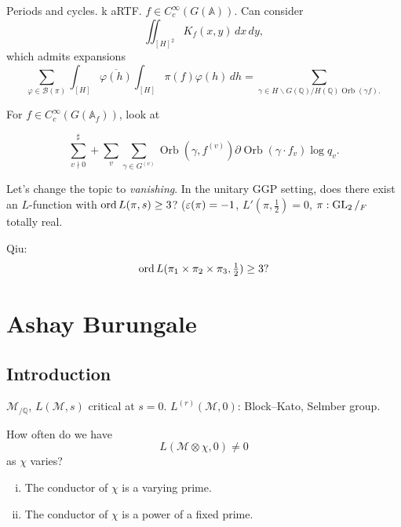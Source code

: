 \documentclass[reqno]{amsart} 
\begin{document}
Periods and cycles.
k
aRTF.  $f \in C_c^\infty(G(\mathbb{A}))$.  Can consider
\begin{equation*}
  \iint_{[H]^2 }
  K_f(x, y) \, d x \, d y,
\end{equation*}
which admits expansions
\begin{equation*}
  \sum_{\varphi \in \mathcal{B}(\pi)} \int_{[H]} \overline{\varphi (h)} \int_{[H]} \pi(f) \varphi(h) \, d h
  = \sum_{\gamma \in H \backslash G(\mathbb{Q}) / H(\mathbb{Q}) \operatorname{Orb}(\gamma f).}
\end{equation*}

For $f \in C_c^\infty(G(\mathbb{A}_f))$, look at

\begin{equation*}
  \sum_{v \nmid 0}^{\sharp} + \sum_v \sum_{\gamma \in G^{(v) }} \operatorname{Orb}(\gamma, f^{(v)})
  \partial \operatorname{Orb}(\gamma \cdot f_v ) \log q_v.
\end{equation*}

Let's change the topic to \emph{vanishing}.  In the unitary GGP setting, does there exist an $L$-function with $\operatorname{ord} L(\pi, s) \geq 3$?  ($\varepsilon(\pi) = - 1$, $L '(\pi, \tfrac{1}{2} ) = 0$, $\pi : \operatorname{GL}_2/_F$ totally real.

Qiu:
\begin{equation*}
\operatorname{ord} L(\pi_1 \times \pi_2 \times \pi_3, \tfrac{1}{2}) \geq 3?
\end{equation*}

\section{Ashay Burungale}\label{sec:cnfhlpuyt9}

\subsection{Introduction}\label{sec:cnfhlpux35}
$\mathcal{M}_{/ \mathbb{Q}}$, $L(\mathcal{M}, s)$ critical at $s = 0$. $L^{(r)}(\mathcal{M}, 0)$: Block--Kato, Selmber group.

\begin{question}\label{question:cnfg5j4o4z}
  How often do we have
  \begin{equation*}
    L(\mathcal{M} \otimes \chi, 0) \neq 0
  \end{equation*}
  as $\chi$ varies?
\end{question}
\begin{enumerate}[(i)]
\item The conductor of $\chi$ is a varying prime.
\item The conductor of $\chi$ is a power of a fixed prime.
\end{enumerate}
\end{document}
